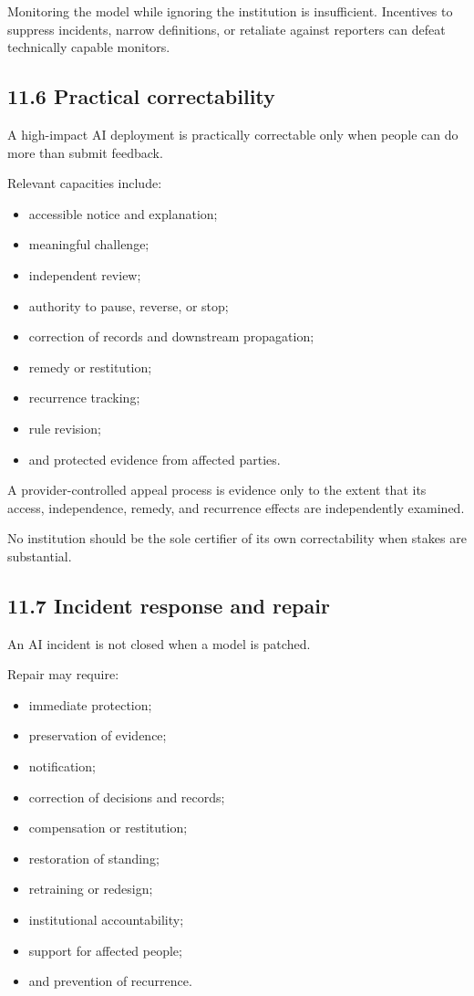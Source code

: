 \documentclass[
  11pt,
]{article}
\providecommand{\tightlist}{%
  \setlength{\itemsep}{0pt}\setlength{\parskip}{0pt}}
\begin{document}
Monitoring the model while ignoring the institution is insufficient.
Incentives to suppress incidents, narrow definitions, or retaliate
against reporters can defeat technically capable monitors.

\subsection{11.6 Practical
correctability}\label{practical-correctability}

A high-impact AI deployment is practically correctable only when people
can do more than submit feedback.

Relevant capacities include:

\begin{itemize}
\tightlist
\item
  accessible notice and explanation;
\item
  meaningful challenge;
\item
  independent review;
\item
  authority to pause, reverse, or stop;
\item
  correction of records and downstream propagation;
\item
  remedy or restitution;
\item
  recurrence tracking;
\item
  rule revision;
\item
  and protected evidence from affected parties.
\end{itemize}

A provider-controlled appeal process is evidence only to the extent that
its access, independence, remedy, and recurrence effects are
independently examined.

No institution should be the sole certifier of its own correctability
when stakes are substantial.

\subsection{11.7 Incident response and
repair}\label{incident-response-and-repair}

An AI incident is not closed when a model is patched.

Repair may require:

\begin{itemize}
\tightlist
\item
  immediate protection;
\item
  preservation of evidence;
\item
  notification;
\item
  correction of decisions and records;
\item
  compensation or restitution;
\item
  restoration of standing;
\item
  retraining or redesign;
\item
  institutional accountability;
\item
  support for affected people;
\item
  and prevention of recurrence.
\end{itemize}
\end{document}
